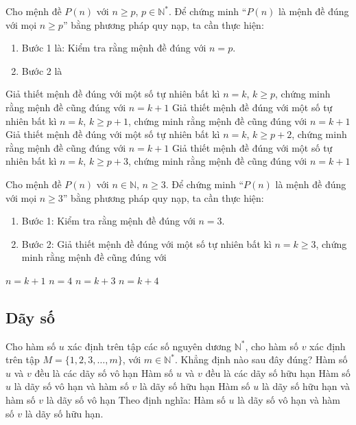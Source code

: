\begin{ex}%
	Cho mệnh đề $P(n)$ với $n\geq p$, $p\in\mathbb{N}^*$. Để chứng minh ``$P(n)$ là mệnh đề đúng với mọi $n\geq p$'' bằng phương pháp quy nạp, ta cần thực hiện:
	\begin{enumerate}[$\bullet$]
		\item Bước 1 là: Kiểm tra rằng mệnh đề đúng với $n=p$.
		\item Bước 2 là
	\end{enumerate}
	\choice
	{\True Giả thiết mệnh đề đúng với một số tự nhiên bất kì $n=k$, $k\geq p$, chứng minh rằng mệnh đề cũng đúng với $n=k+1$}
	{Giả thiết mệnh đề đúng với một số tự nhiên bất kì $n=k$, $k\geq p+1$, chứng minh rằng mệnh đề cũng đúng với $n=k+1$}
	{Giả thiết mệnh đề đúng với một số tự nhiên bất kì $n=k$, $k\geq p+2$, chứng minh rằng mệnh đề cũng đúng với $n=k+1$}
	{Giả thiết mệnh đề đúng với một số tự nhiên bất kì $n=k$, $k\geq p+3$, chứng minh rằng mệnh đề cũng đúng với $n=k+1$}
\end{ex}

\begin{ex}%
	Cho mệnh đề $P(n)$ với $n\in\mathbb{N}$, $n\geq3$. Để chứng minh ``$P(n)$ là mệnh đề đúng với mọi $n\geq 3$'' bằng phương pháp quy nạp, ta cần thực hiện:
	\begin{enumerate}[$\bullet$]
		\item Bước 1: Kiểm tra rằng mệnh đề đúng với $n=3$.
		\item Bước 2: Giả thiết mệnh đề đúng với một số tự nhiên bất kì $n=k\geq 3$, chứng minh rằng mệnh đề cũng đúng với
	\end{enumerate}
	\choice
	{\True $n=k+1$}
	{$n=4$}
	{$n=k+3$}
	{$n=k+4$}
\end{ex}

\subsection{Dãy số}
\begin{ex}%
	Cho hàm số $u$ xác định trên tập các số nguyên dương $\mathbb{N^*}$, cho hàm số $v$ xác định trên tập $M=\{1, 2, 3,\ldots, m\}$, với $m\in\mathbb{N^*}$. Khẳng định nào sau đây đúng?
	\choice
	{Hàm số $u$ và $v$ đều là các dãy số vô hạn}
	{Hàm số $u$ và $v$ đều là các dãy số hữu hạn}
	{\True Hàm số $u$ là dãy số vô hạn và hàm số $v$ là dãy số hữu hạn}
	{Hàm số $u$ là dãy số hữu hạn và hàm số $v$ là dãy số vô hạn}
	\loigiai
	{Theo định nghĩa: Hàm số $u$ là dãy số vô hạn và hàm số $v$ là dãy số hữu hạn.
	}
\end{ex}

